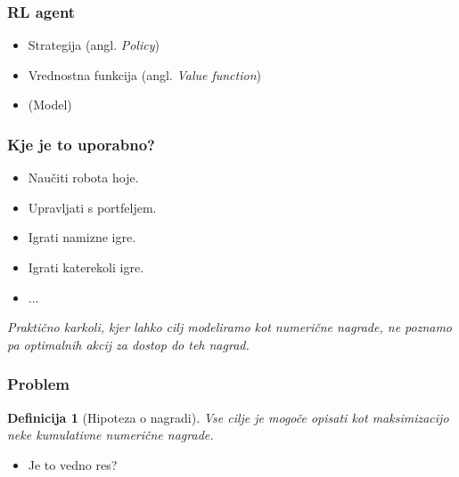 \documentclass{beamer}    %
\newtheorem{definicija}[izrek]{Definicija}
\begin{document}
\begin{frame}
    \frametitle{RL agent}
    \begin{itemize}
        \item Strategija (angl. \textit{Policy})
        \item Vrednostna funkcija (angl. \textit{Value function})
        \item (Model)
    \end{itemize}
\end{frame}


\begin{frame}
    \frametitle{Kje je to uporabno?}
    \begin{itemize}
        \item Naučiti robota hoje.
        \item Upravljati s portfeljem.
        \item Igrati namizne igre.
        \item Igrati katerekoli igre.
        \item ...
    \end{itemize}
    \medskip
    \emph{Praktično karkoli, kjer lahko cilj modeliramo kot numerične
    nagrade, ne poznamo pa optimalnih akcij za dostop do teh nagrad.}
\end{frame}


\begin{frame}
    \frametitle{Problem}
    \begin{definicija}[Hipoteza o nagradi]
        Vse cilje je mogoče opisati kot maksimizacijo neke kumulativne numerične 
        nagrade.
    \end{definicija}

    \medskip

    \begin{itemize}
        \item Je to vedno res?
    \end{itemize}
\end{frame}
\end{document}
